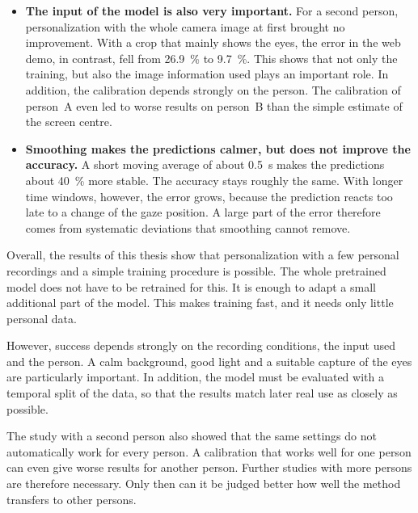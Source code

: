 \begin{itemize}
  \item \textbf{The input of the model is also very important.} For a second
        person, personalization with the whole camera image at first brought no
        improvement. With a crop that mainly shows the eyes, the error in the
        web demo, in contrast, fell from \SI{26.9}{\percent} to
        \SI{9.7}{\percent}. This shows that not only the training, but also the
        image information used plays an important role. In addition, the
        calibration depends strongly on the person. The calibration of person~A
        even led to worse results on person~B than the simple estimate of the
        screen centre.
  \item \textbf{Smoothing makes the predictions calmer, but does not improve the
        accuracy.} A short moving average of about \SI{0.5}{\second} makes the
        predictions about \SI{40}{\percent} more stable. The accuracy stays
        roughly the same. With longer time windows, however, the error grows,
        because the prediction reacts too late to a change of the gaze position.
        A large part of the error therefore comes from systematic deviations
        that smoothing cannot remove.
\end{itemize}

Overall, the results of this thesis show that personalization with a few
personal recordings and a simple training procedure is possible. The whole
pretrained model does not have to be retrained for this. It is enough to adapt
a small additional part of the model. This makes training fast, and it needs
only little personal data.

However, success depends strongly on the recording conditions, the input used
and the person. A calm background, good light and a suitable capture of the
eyes are particularly important. In addition, the model must be evaluated with
a temporal split of the data, so that the results match later real use as
closely as possible.

The study with a second person also showed that the same settings do not
automatically work for every person. A calibration that works well for one
person can even give worse results for another person. Further studies with
more persons are therefore necessary. Only then can it be judged better how
well the method transfers to other persons.

